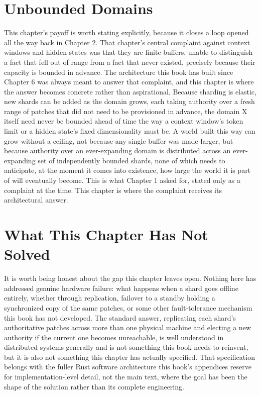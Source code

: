 \section{Unbounded Domains}

This chapter's payoff is worth stating explicitly, because it closes a loop opened all the way back in Chapter 2. That chapter's central complaint against context windows and hidden states was that they are finite buffers, unable to distinguish a fact that fell out of range from a fact that never existed, precisely because their capacity is bounded in advance. The architecture this book has built since Chapter 6 was always meant to answer that complaint, and this chapter is where the answer becomes concrete rather than aspirational. Because sharding is elastic, new shards can be added as the domain grows, each taking authority over a fresh range of patches that did not need to be provisioned in advance, the domain X itself need never be bounded ahead of time the way a context window's token limit or a hidden state's fixed dimensionality must be. A world built this way can grow without a ceiling, not because any single buffer was made larger, but because authority over an ever-expanding domain is distributed across an ever-expanding set of independently bounded shards, none of which needs to anticipate, at the moment it comes into existence, how large the world it is part of will eventually become. This is what Chapter 1 asked for, stated only as a complaint at the time. This chapter is where the complaint receives its architectural answer.

\section{What This Chapter Has Not Solved}

It is worth being honest about the gap this chapter leaves open. Nothing here has addressed genuine hardware failure: what happens when a shard goes offline entirely, whether through replication, failover to a standby holding a synchronized copy of the same patches, or some other fault-tolerance mechanism this book has not developed. The standard answer, replicating each shard's authoritative patches across more than one physical machine and electing a new authority if the current one becomes unreachable, is well understood in distributed systems generally and is not something this book needs to reinvent, but it is also not something this chapter has actually specified. That specification belongs with the fuller Rust software architecture this book's appendices reserve for implementation-level detail, not the main text, where the goal has been the shape of the solution rather than its complete engineering.

